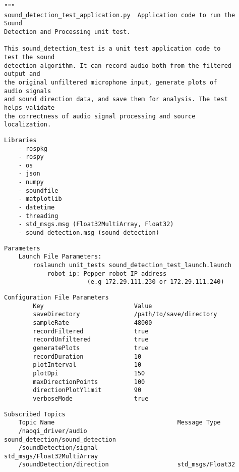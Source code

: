 \documentclass{CSSRforAfrica}
\newcommand{\checkboxChecked}{\fbox{\ding{51}}} %
\begin{document}
\begin{description}

\item[\checkboxChecked] 
 {\small 
\begin{verbatim}
"""
sound_detection_test_application.py  Application code to run the Sound 
Detection and Processing unit test.

This sound_detection_test is a unit test application code to test the sound 
detection algorithm. It can record audio both from the filtered output and 
the original unfiltered microphone input, generate plots of audio signals 
and sound direction data, and save them for analysis. The test helps validate 
the correctness of audio signal processing and source localization.

\end{verbatim}}

\item[\checkboxChecked] 
 {\small 
\begin{verbatim}
Libraries
    - rospkg
    - rospy
    - os
    - json
    - numpy
    - soundfile
    - matplotlib
    - datetime
    - threading
    - std_msgs.msg (Float32MultiArray, Float32)
    - sound_detection.msg (sound_detection)
\end{verbatim}}

\item[\checkboxChecked] 
 {\small 
\begin{verbatim}
Parameters
    Launch File Parameters:
        roslaunch unit_tests sound_detection_test_launch.launch
            robot_ip: Pepper robot IP address 
                       (e.g 172.29.111.230 or 172.29.111.240)
\end{verbatim}}

\item[\checkboxChecked] 
 {\small 
\begin{verbatim}
Configuration File Parameters
        Key                         Value
        saveDirectory               /path/to/save/directory
        sampleRate                  48000
        recordFiltered              true
        recordUnfiltered            true
        generatePlots               true
        recordDuration              10
        plotInterval                10
        plotDpi                     150
        maxDirectionPoints          100
        directionPlotYlimit         90
        verboseMode                 true
\end{verbatim}}

\item[\checkboxChecked] 
 {\small 
\begin{verbatim}
Subscribed Topics
    Topic Name                                  Message Type
    /naoqi_driver/audio                         sound_detection/sound_detection
    /soundDetection/signal                      std_msgs/Float32MultiArray
    /soundDetection/direction                   std_msgs/Float32
\end{verbatim}}


\end{description}
\end{document}
